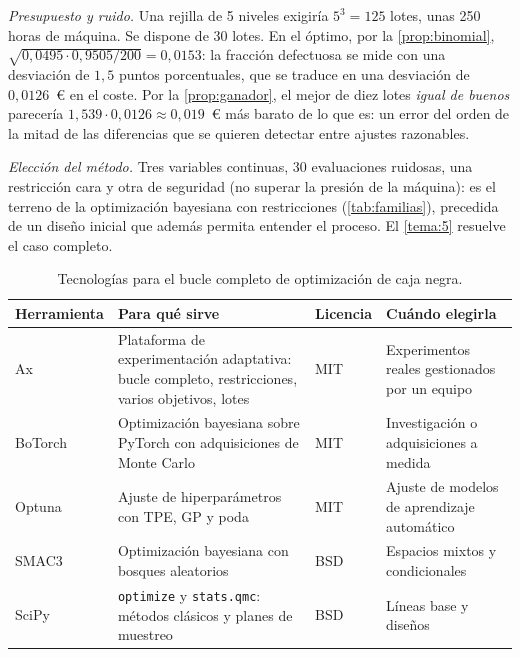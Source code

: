 \begin{ejemplo}
\emph{Presupuesto y ruido.} Una rejilla de 5 niveles exigiría $5^{3}=125$ lotes, unas 250 horas de máquina. Se dispone de 30 lotes. En el óptimo, por la \cref{prop:binomial}, $\sqrt{0{,}0495\cdot0{,}9505/200}=0{,}0153$: la fracción defectuosa se mide con una desviación de $1{,}5$ puntos porcentuales, que se traduce en una desviación de $0{,}0126$~€ en el coste. Por la \cref{prop:ganador}, el mejor de diez lotes \emph{igual de buenos} parecería $1{,}539\cdot0{,}0126\approx0{,}019$~€ más barato de lo que es: un error del orden de la mitad de las diferencias que se quieren detectar entre ajustes razonables.

\emph{Elección del método.} Tres variables continuas, 30 evaluaciones ruidosas, una restricción cara y otra de seguridad (no superar la presión de la máquina): es el terreno de la optimización bayesiana con restricciones (\cref{tab:familias}), precedida de un diseño inicial que además permita entender el proceso. El \cref{tema:5} resuelve el caso completo.
\end{ejemplo}

\begin{table}[ht]
\centering\small
\begin{tabularx}{\textwidth}{@{}>{\raggedright\arraybackslash}p{2.6cm}>{\raggedright\arraybackslash}X>{\raggedright\arraybackslash}p{2.1cm}>{\raggedright\arraybackslash}p{3.6cm}@{}}
\toprule
Herramienta & Para qué sirve & Licencia & Cuándo elegirla \\
\midrule
Ax~\cite{ax} & Plataforma de experimentación adaptativa: bucle completo, restricciones, varios objetivos, lotes & MIT & Experimentos reales gestionados por un equipo \\
BoTorch~\cite{botorch} & Optimización bayesiana sobre PyTorch con adquisiciones de Monte Carlo & MIT & Investigación o adquisiciones a medida \\
Optuna~\cite{optuna} & Ajuste de hiperparámetros con TPE, GP y poda & MIT & Ajuste de modelos de aprendizaje automático \\
SMAC3~\cite{smac3} & Optimización bayesiana con bosques aleatorios & BSD & Espacios mixtos y condicionales \\
SciPy~\cite{scipyqmc} & \texttt{optimize} y \texttt{stats.qmc}: métodos clásicos y planes de muestreo & BSD & Líneas base y diseños \\
\bottomrule
\end{tabularx}
\caption{Tecnologías para el bucle completo de optimización de caja negra.}
\label{tab:tec1}
\end{table}

